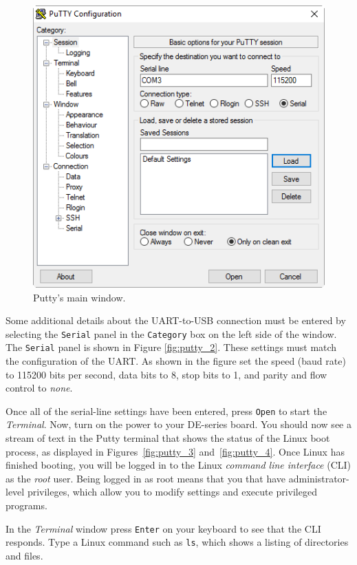 \documentclass[11pt, twoside, pdftex]{article}
\begin{document}
\begin{figure}[H]
   \begin{center}
       \includegraphics[scale=0.7]{figures/fig_putty_tut_1}
   \end{center}
   \caption{Putty's main window.}
	\label{fig:putty_1}
\end{figure}

Some additional details about the UART-to-USB connection must be entered by selecting the 
\texttt{Serial} panel in the \texttt{Category} box on the left side of the window. The
\texttt{Serial}
panel is shown in Figure \ref{fig:putty_2}. These settings must match the configuration of the 
UART. As shown in the figure set the speed (baud rate) to 115200 bits per second, data
bits to 8, stop bits to 1, and parity and flow control to \textit{none}. 

Once all of the serial-line settings have been entered, press \texttt{Open} to start the
{\it Terminal}. Now, turn on the power to your DE-series board. You should now see a stream 
of text in the Putty terminal that shows the status of the Linux boot process, as displayed in 
Figures~\ref{fig:putty_3} and~\ref{fig:putty_4}. Once Linux has finished booting, you will be 
logged in to the Linux {\it command line interface} (CLI) as the \textit{root} user. Being logged 
in as root means that you that have administrator-level privileges, which allow you to modify 
settings and execute privileged programs.

In the {\it Terminal} window press \texttt{Enter} on your keyboard to see that the CLI responds. 
Type a Linux command such as \texttt{ls}, which shows a listing of directories and files. 
\end{document}
